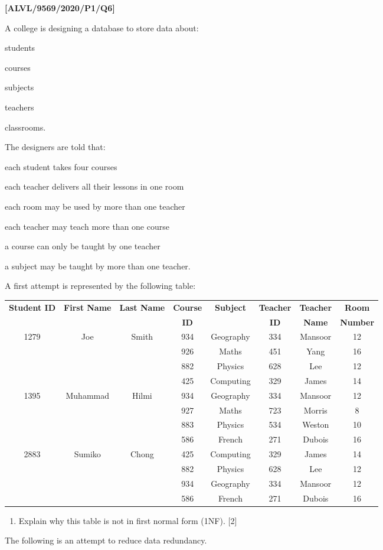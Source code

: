 \item \textbf{{[}ALVL/9569/2020/P1/Q6{]} }

A college is designing a database to store data about:
\begin{itemize}
\begin{singlespace}
\item students
\item courses
\item subjects
\item teachers
\item classrooms.
\end{singlespace}
\end{itemize}
The designers are told that:
\begin{itemize}
\begin{singlespace}
\item each student takes four courses
\item each teacher delivers all their lessons in one room 
\item each room may be used by more than one teacher 
\item each teacher may teach more than one course
\item a course can only be taught by one teacher
\item a subject may be taught by more than one teacher. 
\end{singlespace}
\end{itemize}
A first attempt is represented by the following table:

\begin{tabular}{|c|c|c|c|c|c|c|c|}
\hline 
\multirow{2}{*}{\textbf{Student ID}} & \multirow{2}{*}{\textbf{First Name}} & \multirow{2}{*}{\textbf{Last Name}} & \textbf{Course} & \multirow{2}{*}{\textbf{Subject}} & \textbf{Teacher} & \textbf{Teacher} & \textbf{Room}\tabularnewline
 &  &  & \textbf{ID} &  & \textbf{ID} & \textbf{Name} & \textbf{Number}\tabularnewline
\hline 
\hline 
1279 & Joe & Smith & 934 & Geography & 334 & Mansoor & 12\tabularnewline
\hline 
 &  &  & 926 & Maths & 451 & Yang & 16\tabularnewline
\hline 
 &  &  & 882 & Physics & 628 & Lee & 12\tabularnewline
\hline 
 &  &  & 425 & Computing & 329 & James & 14\tabularnewline
\hline 
1395 & Muhammad & Hilmi & 934 & Geography & 334 & Mansoor & 12\tabularnewline
\hline 
 &  &  & 927 & Maths & 723 & Morris & 8\tabularnewline
\hline 
 &  &  & 883 & Physics & 534 & Weston & 10\tabularnewline
\hline 
 &  &  & 586 & French & 271 & Dubois & 16\tabularnewline
\hline 
2883 & Sumiko & Chong & 425 & Computing & 329 & James & 14\tabularnewline
\hline 
 &  &  & 882 & Physics & 628 & Lee & 12\tabularnewline
\hline 
 &  &  & 934 & Geography & 334 & Mansoor & 12\tabularnewline
\hline 
 &  &  & 586 & French & 271 & Dubois & 16\tabularnewline
\hline 
\end{tabular}
\begin{enumerate}
\item Explain why this table is not in first normal form (1NF). \hfill{}{[}2{]}
\end{enumerate}
The following is an attempt to reduce data redundancy. 

